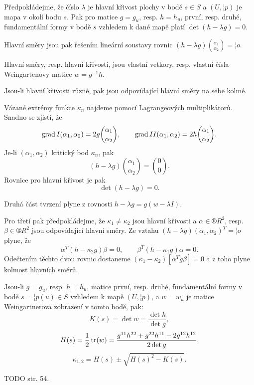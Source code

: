 \documentclass[12pt]{article}                   %
\begin{document}
        \begin{veta}
            Předpokládejme, že číslo $\lambda$ je hlavní křivost plochy v bodě $s \in S$ a $(U, ¦p)$ je mapa v okolí bodu $s$. Pak pro matice $g = g_u$, resp. $h = h_u$, první, resp. druhé, fundamentální formy v bodě $s$ vzhledem k dané mapě platí $\det(h - \lambda g) = 0$.

            Hlavní směry jsou pak řešením lineární soustavy rovnic $(h - \lambda g) \binom{\alpha_1}{\alpha_2} = ¦o$.

            Hlavní směry, resp. hlavní křivosti, jsou vlastní vetkory, resp. vlastní čísla Weingartenovy matice $w = g^{-1}h$.

            Jsou-li hlavní křivosti různé, pak jsou odpovídající hlavní směry na sebe kolmé.

            \begin{dukazin}
                Vázané extrémy funkce $\kappa_n$ najdeme pomocí Lagrangeových multiplikátorů. Snadno se zjistí, že
                $$ \operatorname{grad} I(\alpha_1, \alpha_2) = 2g\binom{\alpha_1}{\alpha_2}, \qquad \operatorname{grad} II(\alpha_1, \alpha_2) = 2h\binom{\alpha_1}{\alpha_2}. $$
                Je-li $(\alpha_1, \alpha_2)$ kritický bod $\kappa_n$, pak
                $$ (h - \lambda g)\binom{\alpha_1}{\alpha_2} = \binom{0}{0}. $$
                Rovnice pro hlavní křivost je pak
                $$ \det(h - \lambda g) = 0. $$

                Druhá část tvrzení plyne z rovnosti $h - \lambda g = g(w - \lambda I)$.

                Pro třetí pak předpokládejme, že $\kappa_1 ≠ \kappa_2$ jsou hlavní křivosti a $\alpha \in ®R^2$, resp. $\beta \in ®R^2$ jsou odpovídající hlavní směry. Ze vztahu $(h - \lambda g)(\alpha_1, \alpha_2)^T = ¦o$ plyne, že
                $$ \alpha^T(h - \kappa_2g)\beta = 0, \qquad \beta^T(h - \kappa_1 g)\alpha = 0. $$
                Odečtením těchto dvou rovnic dostaneme $(\kappa_1 - \kappa_2)[\alpha^Tg\beta] = 0$ a z toho plyne kolmost hlavních směrů.
            \end{dukazin}
        \end{veta}

        \begin{veta}
            Jsou-li $g = g_u$, resp. $h = h_u$, matice první, resp. druhé, fundamentální formy v bodě $s = ¦p(u) \in S$ vzhledem k mapě $(U, ¦p)$, a $w = w_u$ je matice Weingartnerova zobrazení v tomto bodě, pak:
            $$ K(s) = \det w = \frac{\det h}{\det g}, $$
            $$ H(s) = \frac{1}{2}\operatorname{tr}(w) = \frac{g^{11}h^{22} + g^{22}h^{11} - 2g^{12}h^{12}}{2\det g}, $$
            $$ \kappa_{1, 2} = H(s) ± \sqrt{H(s)^2 - K(s)}. $$ 

            \begin{dukazin}
                TODO str. 54.
            \end{dukazin}
        \end{veta}
\end{document}
